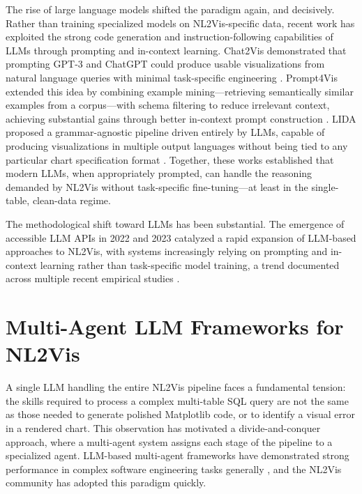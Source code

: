 \documentclass[a4paper,oneside,bibliography=totoc]{scrbook}
\begin{document}
The rise of large language models shifted the paradigm again, and decisively. Rather than training specialized models on NL2Vis-specific data, recent work has exploited the strong code generation and instruction-following capabilities of LLMs through prompting and in-context learning. Chat2Vis demonstrated that prompting GPT-3 and ChatGPT could produce usable visualizations from natural language queries with minimal task-specific engineering \cite{maddigan2023chat2vis}. Prompt4Vis extended this idea by combining example mining---retrieving semantically similar examples from a corpus---with schema filtering to reduce irrelevant context, achieving substantial gains through better in-context prompt construction \cite{li2025prompt4vis}. LIDA proposed a grammar-agnostic pipeline driven entirely by LLMs, capable of producing visualizations in multiple output languages without being tied to any particular chart specification format \cite{dibia2023lida}. Together, these works established that modern LLMs, when appropriately prompted, can handle the reasoning demanded by NL2Vis without task-specific fine-tuning---at least in the single-table, clean-data regime.

The methodological shift toward LLMs has been substantial. The emergence of accessible LLM APIs in 2022 and 2023 catalyzed a rapid expansion of LLM-based approaches to NL2Vis, with systems increasingly relying on prompting and in-context learning rather than task-specific model training, a trend documented across multiple recent empirical studies \cite{wu2024automated,maddigan2023chat2vis,li2025prompt4vis}.

\section{Multi-Agent LLM Frameworks for NL2Vis}
\label{sec:multi_agent}

A single LLM handling the entire NL2Vis pipeline faces a fundamental tension: the skills required to process a complex multi-table SQL query are not the same as those needed to generate polished Matplotlib code, or to identify a visual error in a rendered chart. This observation has motivated a divide-and-conquer approach, where a multi-agent system assigns each stage of the pipeline to a specialized agent. LLM-based multi-agent frameworks have demonstrated strong performance in complex software engineering tasks generally \cite{li2024mas}, and the NL2Vis community has adopted this paradigm quickly.
\end{document}
